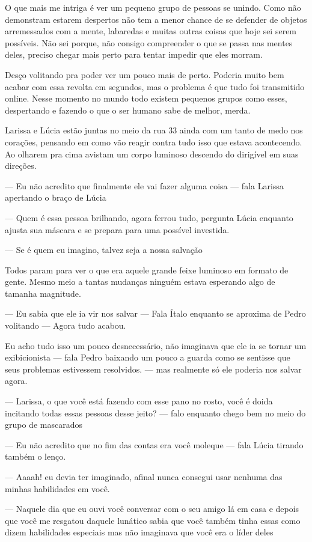O que mais me intriga é ver um pequeno grupo de pessoas se unindo. Como não demonstram estarem despertos não tem a menor chance de se defender de objetos arremessados com a mente, labaredas e muitas outras coisas que hoje sei serem possíveis. Não sei porque, não consigo compreender o que se passa nas mentes deles, preciso chegar mais perto para tentar impedir que eles morram.

Desço volitando pra poder ver um pouco mais de perto. Poderia muito bem acabar com essa revolta em segundos, mas o problema é que tudo foi transmitido online. Nesse momento no mundo todo existem pequenos grupos como esses, despertando e fazendo o que o ser humano sabe de melhor, merda.

Larissa e Lúcia estão juntas no meio da rua 33 ainda com um tanto de medo nos corações, pensando em como vão reagir contra tudo isso que estava acontecendo. Ao olharem pra cima avistam um corpo luminoso descendo do dirigível em suas direções.

— Eu não acredito que finalmente ele vai fazer alguma coisa — fala Larissa apertando o braço de Lúcia

— Quem é essa pessoa brilhando, agora ferrou tudo, pergunta Lúcia enquanto ajusta sua máscara e se prepara para uma possível investida.

— Se é quem eu imagino, talvez seja a nossa salvação

Todos param para ver o que era aquele grande feixe luminoso em formato de gente. Mesmo meio a tantas mudanças ninguém estava esperando algo de tamanha magnitude.

— Eu sabia que ele ia vir nos salvar — Fala Ítalo enquanto se aproxima de Pedro volitando — Agora tudo acabou.

Eu acho tudo isso um pouco desnecessário, não imaginava que ele ia se tornar um exibicionista — fala Pedro baixando um pouco a guarda como se sentisse que seus problemas estivessem resolvidos. — mas realmente só ele poderia nos salvar agora.

— Larissa, o que você está fazendo com esse pano no rosto, você é doida incitando todas essas pessoas desse jeito? — falo enquanto chego bem no meio do grupo de mascarados

— Eu não acredito que no fim das contas era você moleque — fala Lúcia tirando também o lenço.

— Aaaah! eu devia ter imaginado, afinal nunca consegui usar nenhuma das minhas habilidades em você.

— Naquele dia que eu ouvi você conversar com o seu amigo lá em casa e depois que você me resgatou daquele lunático sabia que você também tinha essas como dizem habilidades especiais mas não imaginava que você era o líder deles

